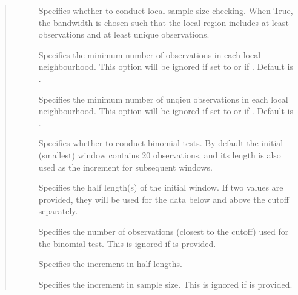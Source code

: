 \documentclass[letterpaper,10pt,english]{sphinxmanual}
\begin{document}
\begin{fulllineitems}
\begin{quote}
\begin{description}
\begin{description}
\item[{}] \leavevmode
\sphinxAtStartPar
Specifies whether to conduct local sample size checking. When True, the bandwidth is chosen such that the local region includes at least  observations and at least  unique observations.

\item[{}] \leavevmode
\sphinxAtStartPar
Specifies the minimum number of observations in each local neighbourhood. This option will be ignored if set to  or if . Default is .

\item[{}] \leavevmode
\sphinxAtStartPar
Specifies the minimum number of unqieu observations in each local neighbourhood. This option will be ignored if set to  or if . Default is .

\item[{}] \leavevmode
\sphinxAtStartPar
Specifies whether to conduct binomial tests. By default the initial (smallest) window contains 20 observations, and its length is also used as the increment for subsequent windows.

\item[{}] \leavevmode
\sphinxAtStartPar
Specifies the half length(s) of the initial window. If two values are provided, they will be used for the data below and above the cutoff separately.

\item[{}] \leavevmode
\sphinxAtStartPar
Specifies the number of observations (closest to the cutoff) used for the binomial test. This is ignored if  is provided.

\item[{}] \leavevmode
\sphinxAtStartPar
Specifies the increment in half lengths.

\item[{}] \leavevmode
\sphinxAtStartPar
Specifies the increment in sample size. This is ignored if  is provided.


\end{description}
\end{description}
\end{quote}
\end{fulllineitems}
\end{document}
